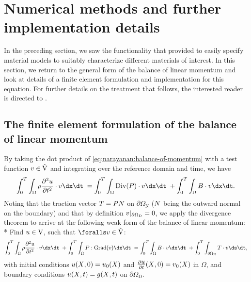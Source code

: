 \section{Numerical methods and further implementation details}

In the preceding section, we saw the functionality that \twist{}
provided to easily specify material models to suitably characterize
different materials of interest. In this section, we return to the
general form of the balance of linear momentum and look at details of
a finite element formulation and implementation for this equation. For
further details on the treatment that follows, the interested reader
is directed to \citet{SimoHughes1998}.

\subsection{The finite element formulation of the balance of linear
  momentum}

By taking the dot product of
\eqref{eq:narayanan:balance-of-momentum} with a test function
$\mbox{$ v$} \in \hat{\mathrm{V}}$ and integrating over the reference domain
and time, we have
\begin{equation}
 \int_{0}^{T} \int_{\Omega} \rho \frac{\partial^{2}
    \bu}{\partial t^{2}} \cdot \bv \dx \dt\;
  = \int_{0}^{T}\int_{\Omega} \mathrm{Div}(\bP) \cdot \bv \dx \dt\;
  + \int_{0}^{T} \int_{\Omega} \bB \cdot \bv \dx \dt.
\end{equation}
Noting that the traction vector $\mbox{$ T$} = \mbox{$ P$} \mbox{$ N$}$ on
$\partial\Omega_{\mathrm{N}}$ ($\mbox{$ N$}$ being the outward normal
on the boundary) and that by definition
$\mbox{$ v$}|_{\partial\Omega_{\mathrm{D}}} = 0$, we apply the divergence
theorem to arrive at the following weak form of the balance of linear
momentum: \\*
Find $\mbox{$ u$} \in \mathrm{V}$, such that $\foralls \bv \in \hat{\mathrm{V}}$:
\begin{equation}
  \int_{0}^{T} \int_{\Omega} \rho \frac{\partial^{2} \bu}{\partial
t^{2}} \cdot \bv \dx \dt\; + \int_{0}^{T} \int_{\Omega}
\bP:\mathrm{Grad}(\bv) \dx \dt\; = \int_{0}^{T} \int_{\Omega} \bB
\cdot \bv \dx \dt\; + \int_{0}^{T} \int_{\partial\Omega_{\mathrm{N}}}
\bT \cdot \bv \ds \dt,
\label{eq:narayanan:weakform}
\end{equation}
with initial conditions $\mbox{$ u$}(\mbox{$ X$}, 0) = \mbox{$ u$}_{0}(\mbox{$ X$})$ and
$\frac{\partial\mbox{$ u$}}{\partial t}(\mbox{$ X$}, 0) = \mbox{$ v$}_{0}(\mbox{$ X$})$ in
$\Omega$, and boundary conditions $\mbox{$ u$}(\mbox{$ X$}, t) = \mbox{$ g$}(\mbox{$ X$}, t)$ on
$\partial\Omega_{\mathrm{D}}$.

